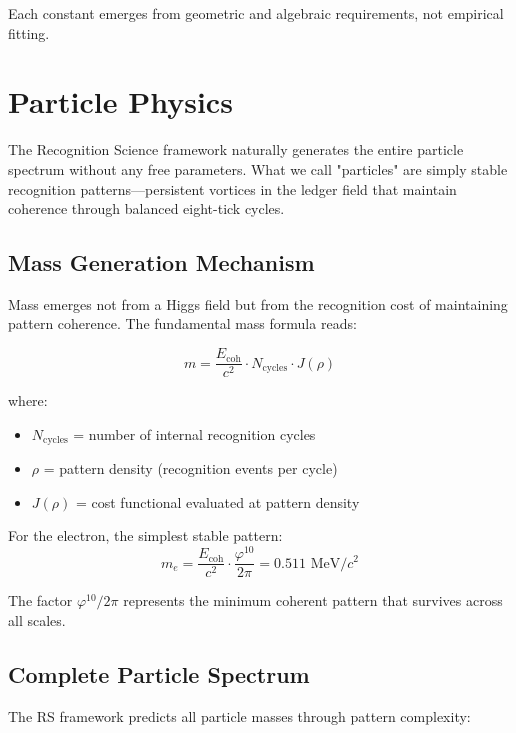 \documentclass[12pt,a4paper]{article}
\newcommand{\Ecoh}{E_{\text{coh}}}
\newcommand{\golden}{\varphi}
\theoremstyle{definition}
\begin{document}
Each constant emerges from geometric and algebraic requirements, not empirical fitting.

\section{Particle Physics}

The Recognition Science framework naturally generates the entire particle spectrum without any free parameters. What we call "particles" are simply stable recognition patterns—persistent vortices in the ledger field that maintain coherence through balanced eight-tick cycles.

\subsection{Mass Generation Mechanism}

Mass emerges not from a Higgs field but from the recognition cost of maintaining pattern coherence. The fundamental mass formula reads:

\begin{equation}
    m = \frac{\Ecoh}{c^2} \cdot N_{\text{cycles}} \cdot J(\rho)
\end{equation}

where:
\begin{itemize}
    \item $N_{\text{cycles}}$ = number of internal recognition cycles
    \item $\rho$ = pattern density (recognition events per cycle)
    \item $J(\rho)$ = cost functional evaluated at pattern density
\end{itemize}

For the electron, the simplest stable pattern:
\begin{equation}
    m_e = \frac{\Ecoh}{c^2} \cdot \frac{\golden^{10}}{2\pi} = 0.511 \text{ MeV}/c^2
\end{equation}

The factor $\golden^{10}/2\pi$ represents the minimum coherent pattern that survives across all scales.

\subsection{Complete Particle Spectrum}

The RS framework predicts all particle masses through pattern complexity:
\end{document}
